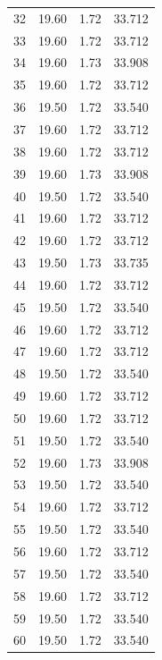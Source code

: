 \begin{table}[htbp]
\begin{tabular}{c S[table-format=2.2] S[table-format=1.2] S[table-format=2.3]}
32 & 19.60 & 1.72 & 33.712 \\
33 & 19.60 & 1.72 & 33.712 \\
34 & 19.60 & 1.73 & 33.908 \\
35 & 19.60 & 1.72 & 33.712 \\
36 & 19.50 & 1.72 & 33.540 \\
37 & 19.60 & 1.72 & 33.712 \\
38 & 19.60 & 1.72 & 33.712 \\
39 & 19.60 & 1.73 & 33.908 \\
40 & 19.50 & 1.72 & 33.540 \\
41 & 19.60 & 1.72 & 33.712 \\
42 & 19.60 & 1.72 & 33.712 \\
43 & 19.50 & 1.73 & 33.735 \\
44 & 19.60 & 1.72 & 33.712 \\
45 & 19.50 & 1.72 & 33.540 \\
46 & 19.60 & 1.72 & 33.712 \\
47 & 19.60 & 1.72 & 33.712 \\
48 & 19.50 & 1.72 & 33.540 \\
49 & 19.60 & 1.72 & 33.712 \\
50 & 19.60 & 1.72 & 33.712 \\
51 & 19.50 & 1.72 & 33.540 \\
52 & 19.60 & 1.73 & 33.908 \\
53 & 19.50 & 1.72 & 33.540 \\
54 & 19.60 & 1.72 & 33.712 \\
55 & 19.50 & 1.72 & 33.540 \\
56 & 19.60 & 1.72 & 33.712 \\
57 & 19.50 & 1.72 & 33.540 \\
58 & 19.60 & 1.72 & 33.712 \\
59 & 19.50 & 1.72 & 33.540 \\
60 & 19.50 & 1.72 & 33.540 \\
\bottomrule
\end{tabular}
\end{table}
